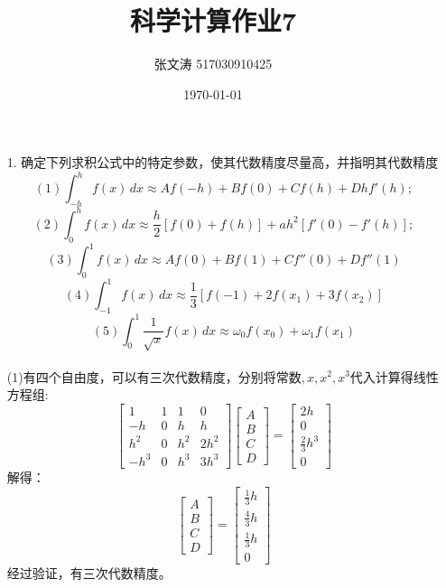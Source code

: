 \documentclass{article}
\title{科学计算作业7}
\author{张文涛 517030910425}
\date{\today}
\begin{document}
	\maketitle
	\begin{itemize}
		\item[1.]确定下列求积公式中的特定参数，使其代数精度尽量高，并指明其代数精度\\
		$$(1)\int_{-h}^{h}f(x)\,dx\approx Af(-h) + Bf(0) + Cf(h) +Dhf'(h);$$
		$$(2)\int_{0}^{h}f(x)\,dx\approx\frac{h}{2}[f(0) + f(h)] + ah^{2}[f'(0) - f'(h)];$$
		$$(3)\int_{0}^{1}f(x)\,dx\approx Af(0) + Bf(1) + Cf''(0) +Df''(1)$$
		$$(4)\int_{-1}^{1}f(x)\,dx\approx\frac{1}{3}[f(-1)+2f(x_1)+3f(x_2)]$$
		$$(5)\int_{0}^{1}\frac{1}{\sqrt{x}}f(x)\,dx\approx \omega_{0}f(x_{0})+\omega_{1}f(x_1)$$\\
		(1)有四个自由度，可以有三次代数精度，分别将$\mbox{常数},x,x^2, x^3$代入计算得线性方程组:
		\begin{equation}
			\nonumber
			\begin{bmatrix} 1 & 1 & 1 & 0\\-h & 0 & h & h\\h^2 & 0 & h^2 & 2h^2 \\-h^3 & 0 & h^3 & 3h^3\end{bmatrix}
			\begin{bmatrix}A\\B\\C\\D\end{bmatrix}
			=
			\begin{bmatrix}2h \\ 0 \\  \frac{2}{3} h^3 \\ 0 \end{bmatrix}
		\end{equation}
		解得：
		\begin{equation}
			\nonumber
			\begin{bmatrix}A\\B\\C\\D\end{bmatrix}
			=
			\begin{bmatrix}\frac{1}{3}h\\\frac{4}{3}h\\\frac{1}{3}h\\0\end{bmatrix}
		\end{equation}
		经过验证，有三次代数精度。\\\\

\end{itemize}
\end{document}
